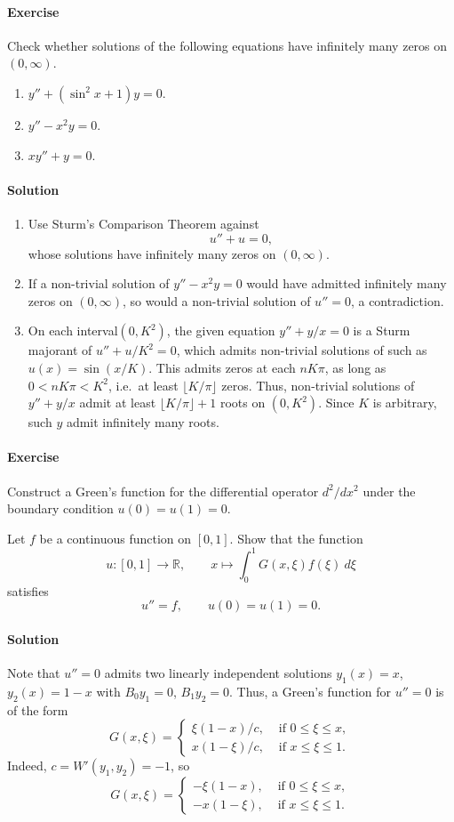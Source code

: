 \documentclass[10pt]{article}
\newcounter{prob}
\newcommand{\problem}{\stepcounter{prob}\paragraph{Exercise \arabic{prob}}}
\newcommand{\solution}{\paragraph{Solution}}
\newcommand{\R}{\mathbb{R}}
\begin{document}
    \problem Check whether solutions of the following equations have infinitely many
    zeros on $(0, \infty)$.
    \begin{enumerate}
        \item $y'' + (\sin^2{x} + 1)y = 0$.
        \item $y'' - x^2y = 0$.
        \item $xy'' + y = 0$.
    \end{enumerate}

    \solution \begin{enumerate}
        \item Use Sturm's Comparison Theorem against \[
            u'' + u = 0,
        \] whose solutions have infinitely many zeros on $(0, \infty)$.

        \item If a non-trivial solution of $y'' - x^2y = 0$ would have admitted
        infinitely many zeros on $(0, \infty)$, so would a non-trivial solution of
        $u'' = 0$, a contradiction.

        \item On each interval$(0, K^2)$, the given equation $y'' + y / x = 0$ is a
        Sturm majorant of $u'' + u / K^2 = 0$, which admits non-trivial solutions of
        such as $u(x) = \sin(x / K)$. This admits zeros at each $nK\pi$, as long as
        $0 < nK\pi < K^2$, i.e.\ at least $\lfloor K/\pi\rfloor$ zeros. Thus,
        non-trivial solutions of $y'' + y / x$ admit at least $\lfloor K/\pi\rfloor +
        1$ roots on $(0, K^2)$. Since $K$ is arbitrary, such $y$ admit infinitely
        many roots.
    \end{enumerate}


    \problem Construct a Green's function for the differential operator $d^2/dx^2$
    under the boundary condition $u(0) = u(1) = 0$.

    Let $f$ be a continuous function on $[0, 1]$. Show that the function \[
        u\colon [0, 1] \to \R, \qquad
        x \mapsto \int_0^1 G(x, \xi) f(\xi) \:d\xi
    \] satisfies \[
        u'' = f, \qquad
        u(0) = u(1) = 0.
    \]

    \solution Note that $u'' = 0$ admits two linearly independent solutions $y_1(x) =
    x$, $y_2(x) = 1 - x$ with $B_0y_1 = 0$, $B_1y_2 = 0$. Thus, a Green's function
    for $u'' = 0$ is of the form \[
        G(x, \xi) = \begin{cases}
            \xi(1 - x) / c, &\text{ if } 0 \leq \xi \leq x, \\
            x(1 - \xi) / c, &\text{ if } x \leq \xi \leq 1.
        \end{cases}
    \] Indeed, $c = W'(y_1, y_2) = -1$, so \[
        G(x, \xi) = \begin{cases}
            -\xi(1 - x), &\text{ if } 0 \leq \xi \leq x, \\
            -x(1 - \xi), &\text{ if } x \leq \xi \leq 1.
        \end{cases}
    \]
\end{document}
